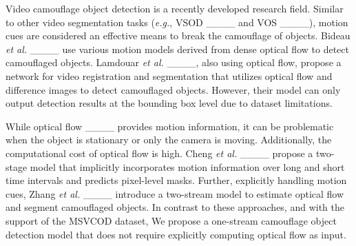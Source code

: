 Video camouflage object detection is a recently developed research field. Similar to other video segmentation tasks (\emph {e.g.}, VSOD ____ and VOS ____), motion cues are considered an effective means to break the camouflage of objects. Bideau \emph {et al.} ____ use various motion models derived from dense optical flow to detect camouflaged objects. Lamdouar \emph {et al.} ____, also using optical flow, propose a network for video registration and segmentation that utilizes optical flow and difference images to detect camouflaged objects. However, their model can only output detection results at the bounding box level due to dataset limitations.

While optical flow ____ provides motion information, it can be problematic when the object is stationary or only the camera is moving. Additionally, the computational cost of optical flow is high. Cheng \emph {et al.} ____ propose a two-stage model that implicitly incorporates motion information over long and short time intervals and predicts pixel-level masks. Further, explicitly handling motion cues, Zhang \emph {et al.} ____ introduce a two-stream model to estimate optical flow and segment camouflaged objects. In contrast to these approaches, and with the support of the MSVCOD dataset, We propose a one-stream camouflage object detection model that does not require explicitly computing optical flow as input.